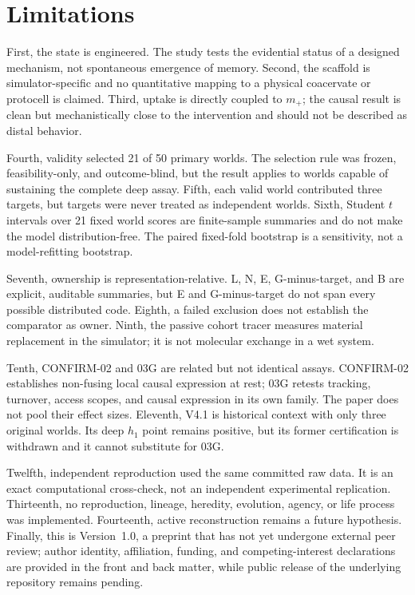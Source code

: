 \documentclass[11pt]{article}
\begin{document}
\section{Limitations}

First, the state is engineered. The study tests the evidential status of a designed mechanism, not spontaneous emergence of memory. Second, the scaffold is simulator-specific and no quantitative mapping to a physical coacervate or protocell is claimed. Third, uptake is directly coupled to $m_+$; the causal result is clean but mechanistically close to the intervention and should not be described as distal behavior.

Fourth, validity selected 21 of 50 primary worlds. The selection rule was frozen, feasibility-only, and outcome-blind, but the result applies to worlds capable of sustaining the complete deep assay. Fifth, each valid world contributed three targets, but targets were never treated as independent worlds. Sixth, Student $t$ intervals over 21 fixed world scores are finite-sample summaries and do not make the model distribution-free. The paired fixed-fold bootstrap is a sensitivity, not a model-refitting bootstrap.

Seventh, ownership is representation-relative. L, N, E, G-minus-target, and B are explicit, auditable summaries, but E and G-minus-target do not span every possible distributed code. Eighth, a failed exclusion does not establish the comparator as owner. Ninth, the passive cohort tracer measures material replacement in the simulator; it is not molecular exchange in a wet system.

Tenth, CONFIRM-02 and 03G are related but not identical assays. CONFIRM-02 establishes non-fusing local causal expression at rest; 03G retests tracking, turnover, access scopes, and causal expression in its own family. The paper does not pool their effect sizes. Eleventh, V4.1 is historical context with only three original worlds. Its deep $h_1$ point remains positive, but its former certification is withdrawn and it cannot substitute for 03G.

Twelfth, independent reproduction used the same committed raw data. It is an exact computational cross-check, not an independent experimental replication. Thirteenth, no reproduction, lineage, heredity, evolution, agency, or life process was implemented. Fourteenth, active reconstruction remains a future hypothesis. Finally, this is Version~1.0, a preprint that has not yet undergone external peer review; author identity, affiliation, funding, and competing-interest declarations are provided in the front and back matter, while public release of the underlying repository remains pending.
\end{document}
